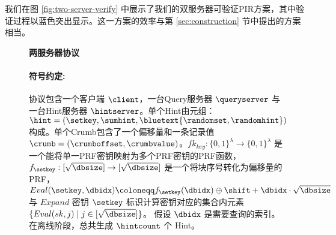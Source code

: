 我们在图 \ref{fig:two-server-verify} 中展示了我们的双服务器可验证PIR方案，其中验证过程以蓝色突出显示。这一方案的效率与第 \ref{sec:construction} 节中提出的方案相当。

\begin{figure*}
    \begin{mdframed}
        \centering
        \textbf{两服务器协议}

        \raggedright
        \paragraph{符号约定:} 协议包含一个客户端 $\client$，一台Query服务器 $\queryserver$ 与一台Hint服务器 $\hintserver$。单个Hint由元组：$\hint=(\setkey,\sumhint,\bluetext{\randomset,\randomhint})$构成。单个Crumb包含了一个偏移量和一条记录值 $\crumb=(\crumboffset,\crumbvalue)$。$fk_{key}:\{0,1\}^\lambda \to \{0,1\}^\lambda$ 是一个能将单一PRF密钥映射为多个PRF密钥的PRF函数， $f_{\setkey}: [\sqrt{\dbsize}]\to [\sqrt{\dbsize}]$ 是一个将块序号转化为偏移量的PRF，  $Eval(\setkey,\dbidx) \coloneqq f_{\setkey}(\dbidx)\oplus \shift + \dbidx\cdot\sqrt{\dbsize}$ 与 $Expand$ 密钥 $\setkey$ 标识计算密钥对应的集合内元素 $\{Eval(sk,j) \mid j\in[\sqrt{\dbsize}]\}$。  假设 $\dbidx$ 是需要查询的索引。 在离线阶段，总共生成 $\hintcount$ 个 Hint。


\end{mdframed}
\end{figure*}

